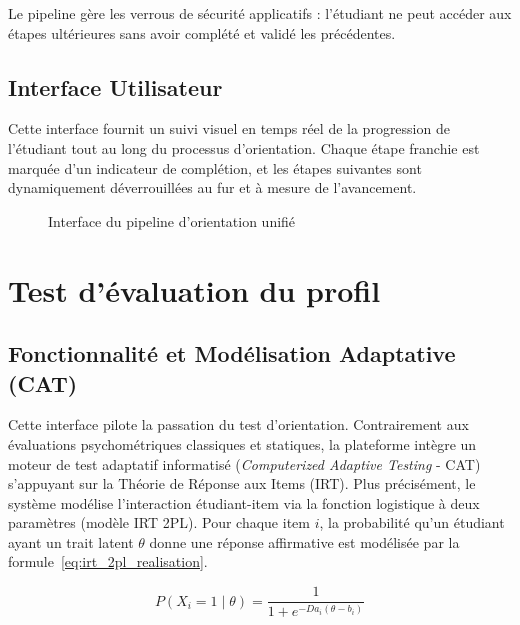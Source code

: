 Le pipeline gère les verrous de sécurité applicatifs : l'étudiant ne peut accéder aux étapes ultérieures sans avoir complété et validé les précédentes.

\subsection{Interface Utilisateur}

Cette interface fournit un suivi visuel en temps réel de la progression de l'étudiant tout au long du processus d'orientation. Chaque étape franchie est marquée d'un indicateur de complétion, et les étapes suivantes sont dynamiquement déverrouillées au fur et à mesure de l'avancement.

\vspace{0.8cm}
\begin{figure}[H]
    \centering
    \caption{Interface du pipeline d'orientation unifié}
    \label{fig:pipeline_orientation_screen}
\end{figure}

\section{Test d'évaluation du profil}
\label{sec:test_cat}

\subsection{Fonctionnalité et Modélisation Adaptative (CAT)}

Cette interface pilote la passation du test d'orientation. Contrairement aux évaluations psychométriques classiques et statiques, la plateforme intègre un moteur de test adaptatif informatisé (\textit{Computerized Adaptive Testing} - CAT) s'appuyant sur la Théorie de Réponse aux Items (IRT). Plus précisément, le système modélise l'interaction étudiant-item via la fonction logistique à deux paramètres (modèle IRT 2PL). Pour chaque item $i$, la probabilité qu'un étudiant ayant un trait latent $\theta$ donne une réponse affirmative est modélisée par la formule~\ref{eq:irt_2pl_realisation}.

\begin{equation}
P(X_i = 1 \mid \theta) = \frac{1}{1 + e^{-D a_i(\theta - b_i)}}
\label{eq:irt_2pl_realisation}
\end{equation}

